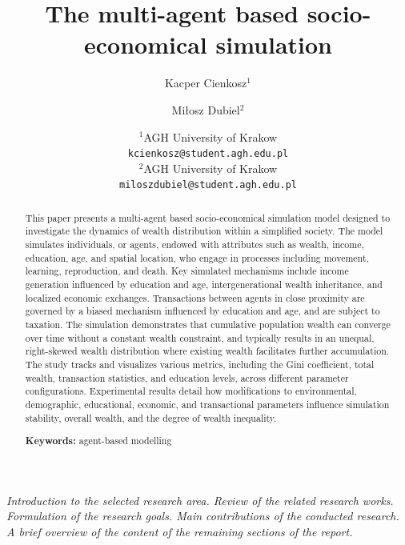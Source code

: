 \documentclass[english]{projectreport}
\author{Kacper Cienkosz$^1$ \and Miłosz Dubiel$^2$}
\title{The multi-agent based socio-economical simulation}
\date{
	{\small $^1$AGH University of Krakow \\ \texttt{kcienkosz@student.agh.edu.pl}\\[1ex]%
	$^2$AGH University of Krakow \\ \texttt{miloszdubiel@student.agh.edu.pl}\\[2ex]%
        \the\year}
      }
\begin{document}
\maketitle

\thispagestyle{empty}

\begin{abstract}
This paper presents a multi-agent based socio-economical simulation model designed to investigate the dynamics of wealth distribution within a simplified society. The model simulates individuals, or agents, endowed with attributes such as wealth, income, education, age, and spatial location, who engage in processes including movement, learning, reproduction, and death. Key simulated mechanisms include income generation influenced by education and age, intergenerational wealth inheritance, and localized economic exchanges. Transactions between agents in close proximity are governed by a biased mechanism influenced by education and age, and are subject to taxation. The simulation demonstrates that cumulative population wealth can converge over time without a constant wealth constraint, and typically results in an unequal, right-skewed wealth distribution where existing wealth facilitates further accumulation. The study tracks and visualizes various metrics, including the Gini coefficient, total wealth, transaction statistics, and education levels, across different parameter configurations. Experimental results detail how modifications to environmental, demographic, educational, economic, and transactional parameters influence simulation stability, overall wealth, and the degree of wealth inequality.
  
\noindent\textbf{Keywords:} agent-based modelling
\end{abstract}

\section{\SectionTitleIntroduction}
\label{sec:introduction}


\emph{Introduction to the selected research area. Review of the related research works. Formulation of the research goals. Main contributions of the conducted research. A brief overview of the content of the remaining sections of the report.}
\end{document}
